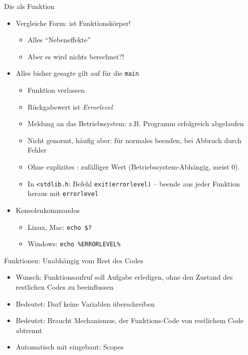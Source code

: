 \begin{frame}[fragile]{Die  als Funktion}
%
\begin{itemize}
\item Vergleiche Form:  ist Funktionskörper!
	\begin{itemize}
	\item Alles \enquote{Nebeneffekte}
	\item Aber es wird nichts berechnet?!
	\end{itemize}
\item Alles bisher gesagte gilt auf für die \texttt{main}
	\begin{itemize}
	\item Funktion  verlassen
	\item Rückgabewert ist \emph{Errorlevel}
	\item Meldung an das Betriebssystem: z.\;B. Programm erfolgreich abgelaufen
	\item Nicht genormt, häufig aber:  für normales beenden,  bei Abbruch durch Fehler
	\item Ohne explizites : zufälliger Wert (Betriebssystem-Abhängig, meist 0).
	\item In \texttt{<stdlib.h}: Befehl \texttt{exit(errorlevel)} -- beende aus jeder Funktion heraus mit \texttt{errorlevel}
	\end{itemize}
\item Konsolenkommandos
	\begin{itemize}
	\item Linux, Mac: \texttt{echo \$?}
	\item Windows: \texttt{echo \%ERRORLEVEL\%}
	\end{itemize}
\end{itemize}
%
\end{frame}


\begin{frame}{Funktionen: Unabhängig vom Rest des Codes}
%
\begin{itemize}
\item Wunsch: Funktionsaufruf soll Aufgabe erledigen, ohne den Zustand des restlichen Codes zu beeinflussen
\item Bedeutet: Darf keine Variablen überschreiben
\item Bedeutet: Braucht Mechanismus, der Funktions-Code von restlichem Code abtrennt
\item[\Thus] Automatisch mit eingebaut: Scopes
\end{itemize}
%
\end{frame}

